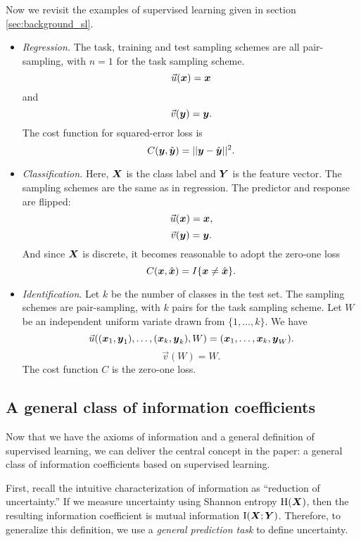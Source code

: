 \documentclass[12pt]{article}
\begin{document}
Now we revisit the examples of supervised learning given in
section \ref{sec:background_sl}.
\begin{itemize}
\item \emph{Regression.}  
The task, training and test sampling schemes are all pair-sampling,
with $n= 1$ for the task sampling scheme.
\[
\vec{u}(\boldsymbol{x}) = \boldsymbol{x}
\]
and
\[
\vec{v}(\boldsymbol{y}) = \boldsymbol{y}.
\]
The cost function for squared-error loss is
\[
C(\boldsymbol{y}, \hat{\boldsymbol{y}}) = ||\boldsymbol{y} - \hat{\boldsymbol{y}}||^2.
\]
\item \emph{Classification.}  
Here, $\boldsymbol{X}$ is the class label and $\boldsymbol{Y}$ is the feature vector. The
sampling schemes are the same as in regression.  The predictor and
response are flipped:
\[
\vec{u}(\boldsymbol{x}) = \boldsymbol{x},
\]
\[
\vec{v}(\boldsymbol{y}) = \boldsymbol{y}.
\]
And since $\boldsymbol{X}$ is discrete, it becomes reasonable to adopt the zero-one loss
\[
C(\boldsymbol{x},  \hat{\boldsymbol{x}}) = I\{\boldsymbol{x} \neq \hat{\boldsymbol{x}}\}.
\]
\item \emph{Identification}.  
Let $k$ be the number of classes in the test set. The sampling schemes
are pair-sampling, with $k$ pairs for the task sampling scheme.  Let
$W$ be an independent uniform variate drawn from $\{1,\hdots, k\}$.
We have
\[
\vec{u}((\boldsymbol{x}_1,\boldsymbol{y}_1),\hdots, (\boldsymbol{x}_k, \boldsymbol{y}_k), W) = (\boldsymbol{x}_1,\hdots, \boldsymbol{x}_k, \boldsymbol{y}_W).
\]
\[
\vec{v}(W) = W.
\]
The cost function $C$ is the zero-one loss.
\end{itemize}

\subsection{A general class of information coefficients}\label{sec:gen_class_sub}

Now that we have the axioms of information and a general definition of
supervised learning, we can deliver the central concept in the paper:
a general class of information coefficients based on supervised
learning.

First, recall the intuitive characterization of information as
``reduction of uncertainty.''  If we measure uncertainty using Shannon
entropy $\text{H}(\boldsymbol{X})$, then the resulting information coefficient is
mutual information $\text{I}(\boldsymbol{X}; \boldsymbol{Y})$.  Therefore, to generalize
this definition, we use a \emph{general prediction task} to define
uncertainty.
\end{document}
